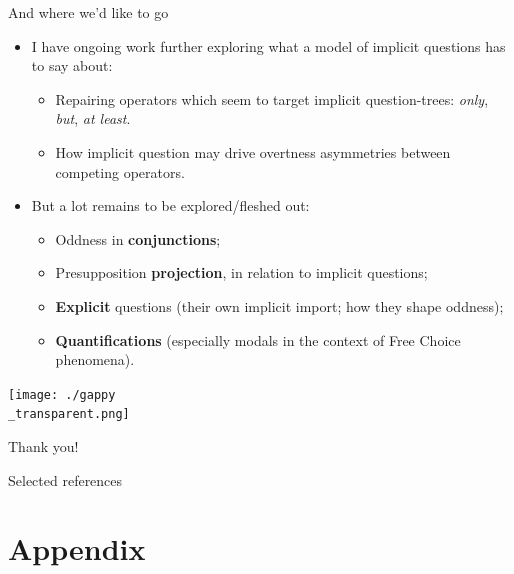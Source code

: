 \documentclass[10pt]{beamer}
\begin{document}
\begin{frame}{And where we'd like to go}
	\begin{itemize}
		\item I have ongoing work further exploring what a model of implicit questions has to say about:
		\begin{itemize}
			\item Repairing operators which seem to target implicit question-trees: \textit{only}, \textit{but}, \textit{at least}.\footnotemark{}
			\item How implicit question may drive overtness asymmetries between competing operators.\footnotemark{}
		\end{itemize}
		\item But a lot remains to be explored/fleshed out:
		\begin{itemize}
			\item Oddness in \textbf{conjunctions};\footnotemark{}
			\item Presupposition \textbf{projection}, in relation to implicit questions;\footnotemark{}
			\item \textbf{Explicit} questions (their own implicit import; how they shape oddness\footnotemark{});
			\item \textbf{Quantifications} (especially modals in the context of Free Choice phenomena\footnotemark).
		\end{itemize} 
	\end{itemize}
	\begin{minipage}{.45\linewidth}
	\end{minipage}
	\begin{minipage}{.45\linewidth}
	\end{minipage}
\end{frame}

\usebackgroundtemplate%
{%
	\texttt{[image: ./gappy\\\_transparent.png]}%
}
\begin{frame}{}
	\begin{center}
		\Huge Thank you!
	\end{center}
\end{frame}
\usebackgroundtemplate{}

\begin{frame}[allowframebreaks]{Selected references}

	\printbibliography[heading=none]
\end{frame}

\section{Appendix}
\end{document}
